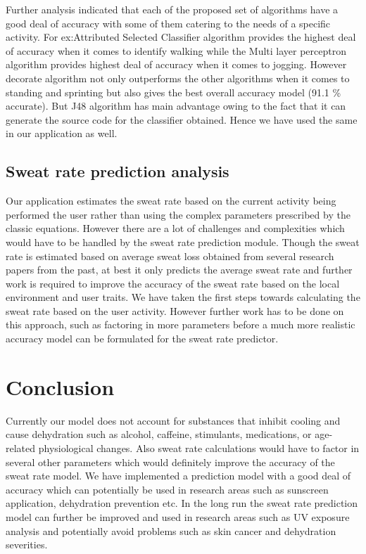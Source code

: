 \documentclass[conference]{IEEEtran}
\begin{document}
Further analysis indicated that each of the proposed set of algorithms have a good deal of accuracy with some of them catering to the needs of a specific activity. For ex:Attributed Selected Classifier algorithm provides the highest deal of accuracy when it comes to identify walking while the Multi layer perceptron algorithm provides highest deal of accuracy when it comes to  jogging. However decorate algorithm not only outperforms the other algorithms when it comes to standing and sprinting but also gives the best overall accuracy model (91.1 \% accurate). But J48 algorithm has main advantage owing to the fact that it can generate the source code for the classifier obtained. Hence we have used the same in our application as well.\\

\subsection{Sweat rate prediction analysis}

Our application estimates the sweat rate based on the current activity being performed the user rather than using the complex parameters prescribed by the classic equations. However there are a lot of challenges and complexities which would have to be handled by the sweat rate prediction module. Though the sweat rate is estimated based on average sweat loss obtained from several research papers from the past, at best it only predicts the average sweat rate and further work is required to improve the accuracy of the sweat rate based on the local environment and user traits. We have taken the first steps towards calculating the sweat rate based on the user activity. However further work has to be done on this approach, such as factoring in more parameters before a much more realistic accuracy model can be formulated for the sweat rate predictor.

\section{Conclusion}
Currently our model does not account for substances that inhibit cooling and cause dehydration such as alcohol, caffeine, stimulants, medications, or age-related physiological changes. Also sweat rate calculations would have to factor in several other parameters which would definitely improve the accuracy of the sweat rate model. We have implemented a prediction model with a good deal of accuracy which can potentially be used in research areas such as sunscreen application, dehydration prevention etc. In the long run the sweat rate prediction model can further be improved and used in research areas such as UV exposure analysis and potentially avoid problems such as skin cancer and dehydration severities.
\end{document}
